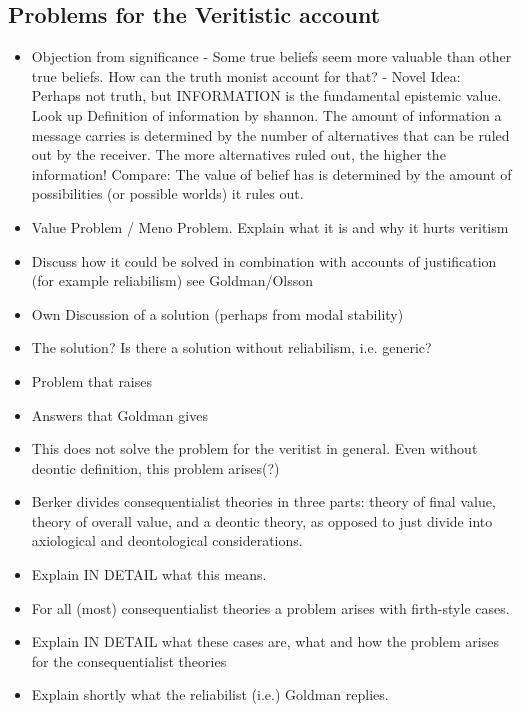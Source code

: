 \documentclass[11pt,numbers=noenddot]{scrartcl}
\begin{document}
\subsection{Problems for the Veritistic account}
\begin{itemize}
\item Objection from significance - Some true beliefs seem more valuable than other true beliefs. How can the truth monist account for that? - Novel Idea: Perhaps not truth, but INFORMATION is the fundamental epistemic value. Look up Definition of information by shannon. The amount of information a message carries is determined by the number of alternatives that can be ruled out by the receiver. The more alternatives ruled out, the higher the information! Compare: The value of belief has is determined by the amount of possibilities (or possible worlds) it rules out.
    \item Value Problem / Meno Problem. Explain what it is and why it hurts veritism 
    \item Discuss how it could be solved in combination with accounts of justification (for example reliabilism) see Goldman/Olsson
    \item Own Discussion of a solution (perhaps from modal stability)
    \item The solution? Is there a solution without reliabilism, i.e. generic?
\end{itemize}
\begin{itemize}
    \item Problem that \citet{Berker2013-BERETA-2} raises
    \item Answers that Goldman gives
    \item This does not solve the problem for the veritist in general. Even without deontic definition, this problem arises(?)
    \item Berker divides consequentialist theories in three parts: theory of final value, theory of overall value, and a deontic theory, as opposed to just divide into axiological and deontological considerations. 
    \item Explain IN DETAIL what this means. 
    \item For all (most) consequentialist theories a problem arises with firth-style cases. 
    \item Explain IN DETAIL what these cases are, what and how the problem arises for the consequentialist theories
    \item Explain shortly what the reliabilist (i.e.) Goldman replies.  
\end{itemize}
\end{document}
